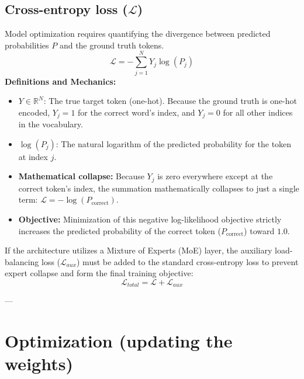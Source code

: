 \documentclass[11pt]{article}
\begin{document}
	\subsection{Cross-entropy loss ($\mathcal{L}$)}
	Model optimization requires quantifying the divergence between predicted probabilities $P$ and the ground truth tokens.
	\begin{equation}
		\mathcal{L} = -\sum_{j=1}^{N} Y_j \log(P_j)
	\end{equation}
	\textbf{Definitions and Mechanics:}
	\begin{itemize}
		\item $Y \in \mathbb{R}^{N}$: The true target token (one-hot).
		Because the ground truth is one-hot encoded, $Y_j = 1$ for the correct word's index, and $Y_j = 0$ for all other indices in the vocabulary.
		\item $\log(P_j)$: The natural logarithm of the predicted probability for the token at index $j$.
		\item \textbf{Mathematical collapse:} Because $Y_j$ is zero everywhere except at the correct token's index, the summation mathematically collapses to just a single term: $\mathcal{L} = -\log(P_{\text{correct}})$.
		\item \textbf{Objective:} Minimization of this negative log-likelihood objective strictly increases the predicted probability of the correct token ($P_{\text{correct}}$) toward $1.0$.
	\end{itemize}
	
	If the architecture utilizes a Mixture of Experts (MoE) layer, the auxiliary load-balancing loss ($\mathcal{L}_{aux}$) must be added to the standard cross-entropy loss to prevent expert collapse and form the final training objective:
	\begin{equation}
		\mathcal{L}_{total} = \mathcal{L} + \mathcal{L}_{aux}
	\end{equation}
	
	---
	
	\section{Optimization (updating the weights)}
	
\end{document}
